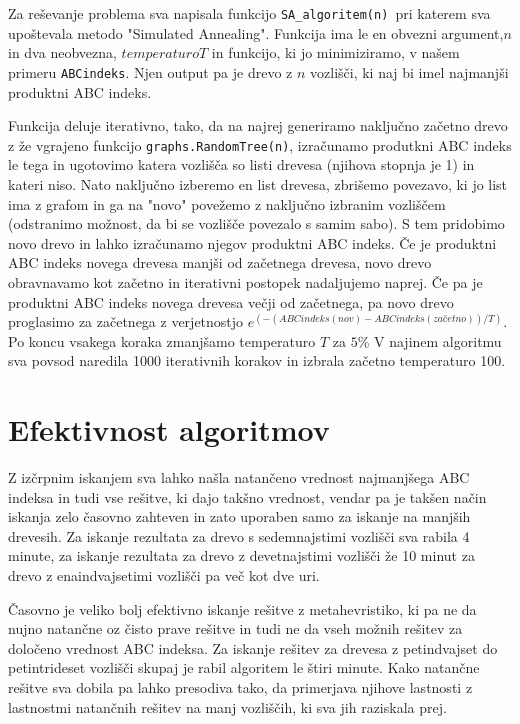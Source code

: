 \documentclass[a4paper,12 pt]{article}
\begin{document}
Za reševanje problema sva napisala funkcijo \texttt{SA\_algoritem(n) }pri katerem sva upoštevala metodo "Simulated Annealing". Funkcija ima le en obvezni argument,$n$ in dva neobvezna, $temperaturo T$ in funkcijo, ki jo minimiziramo, v našem primeru \texttt{ABCindeks}. Njen output pa je drevo z $n$ vozlišči, ki naj bi imel najmanjši produktni ABC indeks.

Funkcija deluje iterativno, tako, da na najrej generiramo naključno začetno drevo z že vgrajeno funkcijo \texttt{graphs.RandomTree(n)}, izračunamo produtkni ABC indeks le tega in ugotovimo katera vozlišča so listi drevesa (njihova stopnja je 1) in kateri niso. Nato naključno izberemo en list drevesa, zbrišemo povezavo, ki jo list ima z grafom in ga na "novo" povežemo z naključno izbranim vozliščem (odstranimo možnost, da bi se vozlišče povezalo s samim sabo). S tem pridobimo novo drevo in lahko izračunamo njegov produktni ABC indeks. Če je produktni ABC indeks novega drevesa manjši od začetnega drevesa, novo drevo obravnavamo kot začetno in iterativni postopek nadaljujemo naprej. Če pa je produktni ABC indeks novega drevesa večji od začetnega, pa novo drevo proglasimo za začetnega z verjetnostjo $e^{(-(ABCindeks(nov) - ABCindeks(začetno))/T)}$. Po koncu vsakega koraka zmanjšamo temperaturo $T$ za $5\%$
V najinem algoritmu sva povsod naredila 1000 iterativnih korakov in izbrala začetno temperaturo 100.


\section[Efektivnost algoritmov]{Efektivnost algoritmov}

Z izčrpnim iskanjem sva lahko našla natančeno vrednost najmanjšega ABC indeksa in tudi vse rešitve, ki dajo takšno vrednost, vendar pa je takšen način iskanja zelo časovno zahteven in zato uporaben samo za iskanje na manjših drevesih. Za iskanje rezultata za drevo s sedemnajstimi vozlišči sva rabila 4 minute, za iskanje rezultata za drevo z devetnajstimi vozlišči že 10 minut za drevo z enaindvajsetimi vozlišči pa več kot dve uri.

Časovno je veliko bolj efektivno iskanje rešitve z metahevristiko, ki pa ne da nujno natančne oz čisto prave rešitve in tudi ne da vseh možnih rešitev za določeno vrednost ABC indeksa. Za iskanje rešitev za drevesa z petindvajset do petintrideset vozlišči skupaj je rabil algoritem le štiri minute. Kako natančne rešitve sva dobila pa lahko presodiva tako, da primerjava njihove lastnosti z lastnostmi natančnih rešitev na manj vozliščih, ki sva jih raziskala prej.
\end{document}
